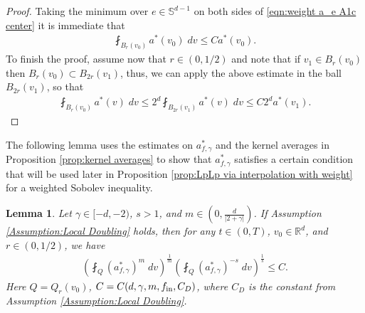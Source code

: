 \documentclass[12pt,american]{amsart}
\numberwithin{equation}{section}
\theoremstyle{plain}
\newtheorem{lem}[thm]{Lemma}
\theoremstyle{definition}                  %
\def\astar{{a^*}}
\def\fin{f_{\textnormal{in}}}
\begin{document}
\begin{proof}
  Taking the minimum over $e\in\mathbb{S}^{d-1}$ on both sides of \eqref{eqn:weight a_e A1c center} it is immediate that
  \begin{align*}
    \fint_{B_r(v_0)}\astar(v_0)\;dv\leq C\astar(v_0).	  
  \end{align*}
  To finish the proof, assume now that $r\in (0,1/2)$ and note that if $v_1 \in B_{r}(v_0)$ then $B_{r}(v_0) \subset B_{2r}(v_1)$, thus, we can apply the above estimate in the ball $B_{2r}(v_1)$, so that
  \begin{align*}
    \fint_{B_r(v_0)}\astar(v)\;dv	\leq 2^d \fint_{B_{2r}(v_1)}\astar(v)\;dv \leq C2^d\astar(v_1).
  \end{align*}	  
\end{proof}

The following lemma uses the estimates on $a^*_{f,\gamma}$ and the kernel averages in Proposition \ref{prop:kernel averages} to show that $a^*_{f,\gamma}$ satisfies a certain condition that will be used later in Proposition \ref{prop:LpLp via interpolation with weight}  for a weighted Sobolev inequality.
\begin{lem} \label{this_is_new_cond_Sob}
  Let $\gamma \in [-d,-2)$, $s>1$, and $m \in (0, \tfrac{d}{|2+\gamma|})$.  If Assumption \ref{Assumption:Local Doubling} holds, then for any $t\in (0,T)$, $v_0 \in \mathbb{R}^d$, and $r\in(0,1/2)$, we have 
  \begin{align*}
    \left ( \fint_{Q}{(a^*_{f,\gamma})}^m\;dv\right )^{\frac{1}{m}} \left ( \fint_{Q}(a^*_{f,\gamma})^{-s}\;dv \right )^{\frac{1}{s}} \leq C.
  \end{align*}
  Here $Q=Q_{r}(v_0)$, $C=C(d,\gamma,m,\fin,C_D)$,  where $C_D$ is the constant from Assumption \ref{Assumption:Local Doubling}.
\end{lem}
\end{document}
